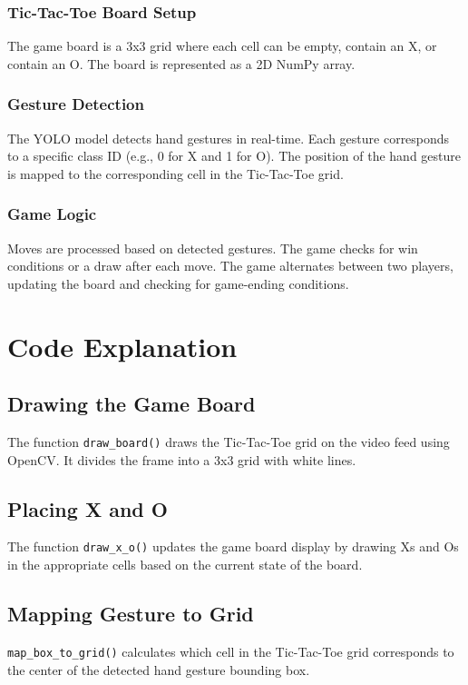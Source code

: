 \documentclass[12pt]{article}
\begin{document}
    \subsubsection{Tic-Tac-Toe Board Setup}
        The game board is a 3x3 grid where each cell can be empty, contain an X, or contain an O. The board is represented as a 2D NumPy array.

    \subsubsection{Gesture Detection}
        The YOLO model detects hand gestures in real-time. Each gesture corresponds to a specific class ID (e.g., 0 for X and 1 for O). The position of the hand gesture is mapped to the corresponding cell in the Tic-Tac-Toe grid.

    \subsubsection{Game Logic}
        Moves are processed based on detected gestures. The game checks for win conditions or a draw after each move. The game alternates between two players, updating the board and checking for game-ending conditions.

\section{Code Explanation}
\subsection{Drawing the Game Board}
    The function \texttt{draw\_board()} draws the Tic-Tac-Toe grid on the video feed using OpenCV. It divides the frame into a 3x3 grid with white lines.

\subsection{Placing X and O}
    The function \texttt{draw\_x\_o()} updates the game board display by drawing Xs and Os in the appropriate cells based on the current state of the board.

\subsection{Mapping Gesture to Grid}
    \texttt{map\_box\_to\_grid()} calculates which cell in the Tic-Tac-Toe grid corresponds to the center of the detected hand gesture bounding box.
\end{document}
